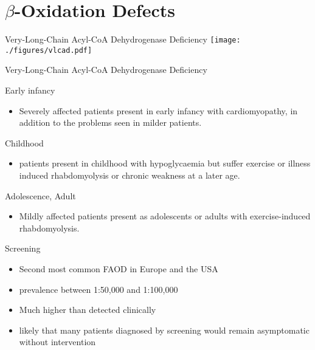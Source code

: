 \documentclass[presentation, smaller]{beamer}
\begin{document}
\section{\(\beta\)-Oxidation Defects}
\label{sec:orgheadline37}
\begin{frame}[label={sec:orgheadline14}]{Very-Long-Chain Acyl-CoA Dehydrogenase Deficiency}
\texttt{[image: ./figures/vlcad.pdf]}
\end{frame}
\begin{frame}[label={sec:orgheadline15}]{Very-Long-Chain Acyl-CoA Dehydrogenase Deficiency}
\scriptsize
\begin{block}{Early infancy}
\begin{itemize}
\item Severely affected patients present in early infancy with
cardiomyopathy, in addition to the problems seen in milder patients.
\end{itemize}
\end{block}

\begin{block}{Childhood}
\begin{itemize}
\item patients present in childhood with hypoglycaemia but suffer exercise
or illness induced rhabdomyolysis or chronic weakness at a later age.
\end{itemize}
\end{block}

\begin{block}{Adolescence, Adult}
\begin{itemize}
\item Mildly affected patients present as adolescents or adults with
exercise-induced rhabdomyolysis.
\end{itemize}
\end{block}

\begin{block}{Screening}
\begin{itemize}
\item Second most common FAOD in Europe and the USA
\item prevalence between 1:50,000 and 1:100,000
\item Much higher than detected clinically
\item likely that many patients diagnosed by screening would remain
asymptomatic without intervention
\end{itemize}
\end{block}
\end{frame}
\end{document}
